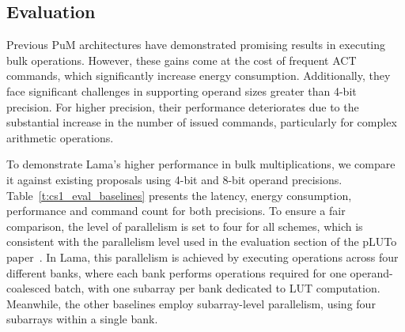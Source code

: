\begin{table}[t!]
\caption{Summary of the area and power consumption of the added logic in the Lama architecture.}
\label{t:overhead}
\begin{center}
\end{center}
\end{table}

\subsection{Evaluation}\label{eval_mult8b}
Previous PuM architectures have demonstrated promising results in executing bulk operations. However, these gains come at the cost of frequent ACT commands, which significantly increase energy consumption. Additionally, they face significant challenges in supporting operand sizes greater than 4-bit precision. For higher precision, their performance deteriorates due to the substantial increase in the number of issued commands, particularly for complex arithmetic operations.

To demonstrate Lama's higher performance in bulk multiplications, we compare it against existing proposals using 4-bit and 8-bit operand precisions. Table~\ref{t:cs1_eval_baselines} presents the latency, energy consumption, performance and command count for both precisions. To ensure a fair comparison, the level of parallelism is set to four for all schemes, which is consistent with the parallelism level used in the evaluation section of the pLUTo paper~\cite{pluto}. In Lama, this parallelism is achieved by executing operations across four different banks, where each bank performs operations required for one operand-coalesced batch, with one subarray per bank dedicated to LUT computation. Meanwhile, the other baselines employ subarray-level parallelism, using four subarrays within a single bank.

